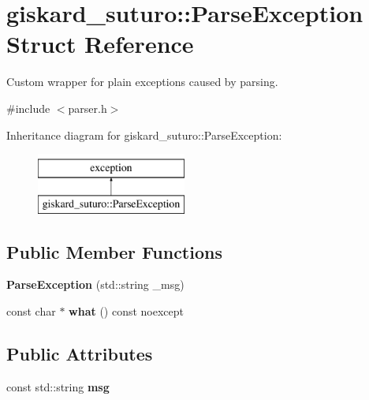 \hypertarget{structgiskard__suturo_1_1ParseException}{\section{giskard\-\_\-suturo\-:\-:Parse\-Exception Struct Reference}
\label{structgiskard__suturo_1_1ParseException}
}


Custom wrapper for plain exceptions caused by parsing.  




{\ttfamily \#include $<$parser.\-h$>$}

Inheritance diagram for giskard\-\_\-suturo\-:\-:Parse\-Exception\-:\begin{figure}[H]
\begin{center}
\leavevmode
\includegraphics[height=2.000000cm]{structgiskard__suturo_1_1ParseException}
\end{center}
\end{figure}
\subsection*{Public Member Functions}
\begin{DoxyCompactItemize}
\item 
\hypertarget{structgiskard__suturo_1_1ParseException_a1fcd3214c79160e1b3043dd2be1d1f40}{{\bfseries Parse\-Exception} (std\-::string \-\_\-msg)}\label{structgiskard__suturo_1_1ParseException_a1fcd3214c79160e1b3043dd2be1d1f40}

\item 
\hypertarget{structgiskard__suturo_1_1ParseException_a25152a6e0783140f78abc50a28442090}{const char $\ast$ {\bfseries what} () const noexcept}\label{structgiskard__suturo_1_1ParseException_a25152a6e0783140f78abc50a28442090}

\end{DoxyCompactItemize}
\subsection*{Public Attributes}
\begin{DoxyCompactItemize}
\item 
\hypertarget{structgiskard__suturo_1_1ParseException_aaa2d22acb6b0be5d7d037ef591bcbabc}{const std\-::string {\bfseries msg}}\label{structgiskard__suturo_1_1ParseException_aaa2d22acb6b0be5d7d037ef591bcbabc}

\end{DoxyCompactItemize}


